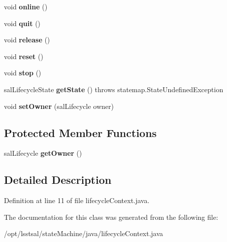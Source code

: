 \begin{DoxyCompactItemize}
\item 
\hypertarget{classlifecycle_1_1lifecycle_context_a82681c49b8ecf3cbed7a5733e1bcbb61}{void {\bfseries online} ()}\label{classlifecycle_1_1lifecycle_context_a82681c49b8ecf3cbed7a5733e1bcbb61}

\item 
\hypertarget{classlifecycle_1_1lifecycle_context_a71e44db82ade949a67628032768ab1db}{void {\bfseries quit} ()}\label{classlifecycle_1_1lifecycle_context_a71e44db82ade949a67628032768ab1db}

\item 
\hypertarget{classlifecycle_1_1lifecycle_context_aefb2a02c5668ab3b3d15fd5e76d6d3bd}{void {\bfseries release} ()}\label{classlifecycle_1_1lifecycle_context_aefb2a02c5668ab3b3d15fd5e76d6d3bd}

\item 
\hypertarget{classlifecycle_1_1lifecycle_context_a14a8b6d9f7cafb94580970b4a7c870f4}{void {\bfseries reset} ()}\label{classlifecycle_1_1lifecycle_context_a14a8b6d9f7cafb94580970b4a7c870f4}

\item 
\hypertarget{classlifecycle_1_1lifecycle_context_a70b4e87f95d77277405a40e08828811d}{void {\bfseries stop} ()}\label{classlifecycle_1_1lifecycle_context_a70b4e87f95d77277405a40e08828811d}

\item 
\hypertarget{classlifecycle_1_1lifecycle_context_a2bce72e6958c30da61aa3f0a05f6a34e}{sal\-Lifecycle\-State {\bfseries get\-State} ()  throws statemap.\-State\-Undefined\-Exception     }\label{classlifecycle_1_1lifecycle_context_a2bce72e6958c30da61aa3f0a05f6a34e}

\item 
\hypertarget{classlifecycle_1_1lifecycle_context_acf2bcf1b7bbe7de2d1f86bb7bc278cbe}{void {\bfseries set\-Owner} (sal\-Lifecycle owner)}\label{classlifecycle_1_1lifecycle_context_acf2bcf1b7bbe7de2d1f86bb7bc278cbe}

\end{DoxyCompactItemize}
\subsection*{Protected Member Functions}
\begin{DoxyCompactItemize}
\item 
\hypertarget{classlifecycle_1_1lifecycle_context_a4ee607b0c76688c1f776d1bd4737efde}{sal\-Lifecycle {\bfseries get\-Owner} ()}\label{classlifecycle_1_1lifecycle_context_a4ee607b0c76688c1f776d1bd4737efde}

\end{DoxyCompactItemize}


\subsection{Detailed Description}


Definition at line 11 of file lifecycle\-Context.\-java.



The documentation for this class was generated from the following file\-:\begin{DoxyCompactItemize}
\item 
/opt/lsstsal/state\-Machine/java/lifecycle\-Context.\-java\end{DoxyCompactItemize}
